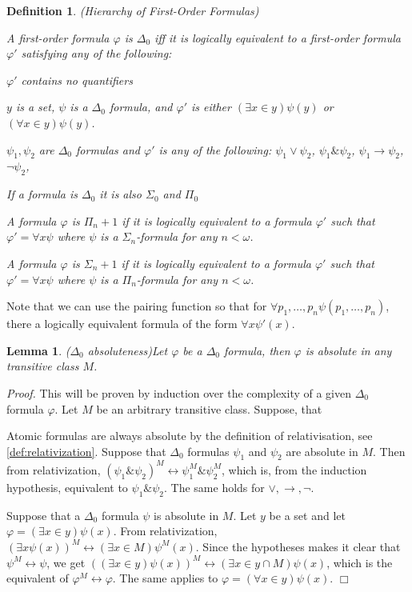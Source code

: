 \documentclass[12pt,a4paper]{article}
\newtheorem{definition}[theorem]{Definition}
\newtheorem{lemma}[theorem]{Lemma}
\newenvironment{proof}
{\noindent \textit{Proof.}}
{\hspace*{\fill} $\Box$}
\renewcommand{\iff}{\leftrightarrow}
\newcommand{\then}{\rightarrow}
\newcommand{\bce}{\begin{compactenum}}
\newcommand{\ece}{\end{compactenum}}
\newcommand{\et}{\mathrel{\&}}
\begin{document}
\begin{definition}{(Hierarchy of First-Order Formulas)}\\
\bce[(I)]
A first-order formula $\varphi$ is $\Delta_0$ iff it is logically equivalent to a first-order formula $\varphi'$ satisfying any of the following:
\bce[(i)]
\item $\varphi'$ contains no quantifiers
\item $y$ is a set, $\psi$ is a $\Delta_0$ formula, and $\varphi'$ is either $(\exists x \in y)\psi(y)$ or $(\forall x \in y)\psi(y)$.
\item $\psi_1, \psi_2$ are $\Delta_0$ formulas and $\varphi'$ is any of the following: $\psi_1 \lor \psi_2$, $\psi_1 \et \psi_2$, $\psi_1 \then \psi_2$, $\neg \psi_2$, 
\ece
\item If a formula is $\Delta_0$ it is also $\Sigma_0$ and $\Pi_0$
\item A formula $\varphi$ is $\Pi_n+1$ if it is logically equivalent to a formula $\varphi'$ such that $\varphi' = \forall x \psi$ where $\psi$ is a $\Sigma_n$-formula for any $n < \omega$.
\item A formula $\varphi$ is $\Sigma_n+1$ if it is logically equivalent to a formula $\varphi'$ such that $\varphi' = \forall x \psi$ where $\psi$ is a $\Pi_n$-formula for any $n < \omega$.
\ece
\end{definition}
Note that we can use the pairing function so that for $\forall p_1, \ldots, p_n \psi(p_1, \ldots, p_n)$, there a logically equivalent formula of the form $\forall x \psi'(x)$.

\begin{lemma}{($\Delta_0$ absoluteness)}\label{lemma:delta_0_absoluteness}
Let $\varphi$ be a $\Delta_0$ formula, then $\varphi$ is absolute in any transitive class $M$.
\end{lemma}

\begin{proof}
This will be proven by induction over the complexity of a given $\Delta_0$ formula $\varphi$. Let $M$ be an arbitrary transitive class. Suppose, that 

Atomic formulas are always absolute by the definition of relativisation, see \ref{def:relativization}.
Suppose that $\Delta_0$ formulas $\psi_1$ and $\psi_2$ are absolute in $M$. Then from relativization, $(\psi_1 \et \psi_2)^M \iff \psi_1^M \et \psi_2^M$, which is, from the induction hypothesis, equivalent to $\psi_1 \et \psi_2$. The same holds for $\lor, \then, \neg$.

Suppose that a $\Delta_0$ formula $\psi$ is absolute in $M$. Let $y$ be a set and let $\varphi = (\exists x \in y) \psi(x)$. 
From relativization, $(\exists x \psi(x))^M \iff (\exists x \in M) \psi^M(x)$. Since the hypotheses makes it clear that $\psi^M \iff \psi$, we get $((\exists x \in y) \psi(x))^M \iff (\exists x \in y\cap M) \psi(x)$, which is the equivalent of $\varphi^M \iff \varphi$. The same applies to $\varphi = (\forall x \in y) \psi(x)$.
\end{proof}
\end{document}
